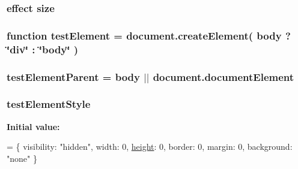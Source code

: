 \hypertarget{jquery-ui_8js_a8aed6b484654e16a41c505f6907b5ec6}{
\subsubsection[{size}]{ effect size}}\label{jquery-ui_8js_a8aed6b484654e16a41c505f6907b5ec6}
\hypertarget{jquery-ui_8js_aebb73004a304067d577bd97fcc4e9f12}{
\subsubsection[{test\+Element}]{\setlength{\rightskip}{0pt plus 5cm}function test\+Element = document.\+create\+Element( body ? \char`\"{}div\char`\"{} \+: \char`\"{}body\char`\"{} )}}\label{jquery-ui_8js_aebb73004a304067d577bd97fcc4e9f12}
\hypertarget{jquery-ui_8js_aa8ad937fe0adb4e8d61bc2ab650206a4}{
\subsubsection[{test\+Element\+Parent}]{\setlength{\rightskip}{0pt plus 5cm}test\+Element\+Parent = body $\vert$$\vert$ document.\+document\+Element}}\label{jquery-ui_8js_aa8ad937fe0adb4e8d61bc2ab650206a4}
\hypertarget{jquery-ui_8js_a637b11fa52de12147847aba5fa59352b}{
\subsubsection[{test\+Element\+Style}]{\setlength{\rightskip}{0pt plus 5cm}test\+Element\+Style}}\label{jquery-ui_8js_a637b11fa52de12147847aba5fa59352b}
{\bfseries Initial value\+:}
\begin{DoxyCode}
= \{
        visibility: \textcolor{stringliteral}{"hidden"},
        width: 0,
        \hyperlink{jquery-ui_8js_a53b668b89fc43ad1964bca7d45307d62}{height}: 0,
        border: 0,
        margin: 0,
        background: \textcolor{stringliteral}{"none"}
    \}
\end{DoxyCode}
